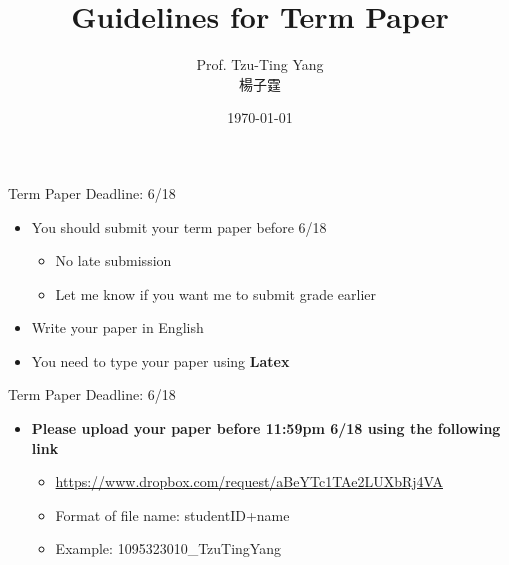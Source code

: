 \documentclass[dvipsnames,hyperref={pdfpagelabels=false}]{beamer}
\title[]  
{Guidelines for Term Paper}
\author 
{Prof. Tzu-Ting Yang  \\ 楊子霆}
\institute{Institute of Economics, Academia Sinica  \\ 中央研究院經濟研究所}
\date
{\today}
\begin{document}
\begin{frame}{}
 \titlepage
\end{frame}


\begin{frame}{Term Paper Deadline: 6/18}
\begin{itemize}
	
	\item You should submit your term paper before 6/18
	\vspace{0.2cm} 
	\begin{itemize}
		\item No late submission 
		\vspace{0.2cm}
		\item Let me know if you want me to submit grade earlier
	\end{itemize}
	\vspace{0.2cm}
	\item Write your paper in English
   \vspace{0.2cm}
    \item You need to type your paper using \textbf{Latex}
	
\end{itemize}
\end{frame}



\begin{frame}{Term Paper Deadline: 6/18}
	\begin{itemize}
		
	  \item \textbf{Please upload your paper before 11:59pm 6/18 using the following link}
	\vspace{0.2cm}
	\begin{itemize}
		\item \url{https://www.dropbox.com/request/aBeYTc1TAe2LUXbRj4VA}
		\vspace{0.2cm}
		\item Format of file name: studentID+name
		\vspace{0.2cm}
		\item Example: 1095323010\_TzuTingYang
		\vspace{0.2cm}
	\end{itemize}
		
	\end{itemize}
\end{frame}
\end{document}
